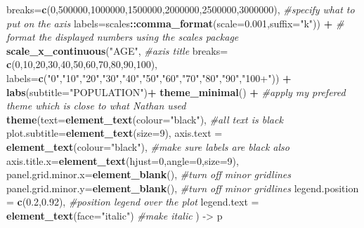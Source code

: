 \documentclass[]{article}
\newenvironment{Shaded}{\begin{snugshade}}{\end{snugshade}}
\newcommand{\KeywordTok}[1]{\textcolor[rgb]{0.13,0.29,0.53}{\textbf{#1}}}
\newcommand{\DataTypeTok}[1]{\textcolor[rgb]{0.13,0.29,0.53}{#1}}
\newcommand{\DecValTok}[1]{\textcolor[rgb]{0.00,0.00,0.81}{#1}}
\newcommand{\FloatTok}[1]{\textcolor[rgb]{0.00,0.00,0.81}{#1}}
\newcommand{\StringTok}[1]{\textcolor[rgb]{0.31,0.60,0.02}{#1}}
\newcommand{\CommentTok}[1]{\textcolor[rgb]{0.56,0.35,0.01}{\textit{#1}}}
\newcommand{\OperatorTok}[1]{\textcolor[rgb]{0.81,0.36,0.00}{\textbf{#1}}}
\newcommand{\NormalTok}[1]{#1}
\begin{document}
\begin{Shaded}
\begin{Highlighting}[]
{                     \DataTypeTok{breaks=}\KeywordTok{c}\NormalTok{(}\DecValTok{0}\NormalTok{,}\DecValTok{500000}\NormalTok{,}\DecValTok{1000000}\NormalTok{,}\DecValTok{1500000}\NormalTok{,}\DecValTok{2000000}\NormalTok{,}\DecValTok{2500000}\NormalTok{,}\DecValTok{3000000}\NormalTok{), }\CommentTok{#specify what to put on the axis}
                     \DataTypeTok{labels=}\NormalTok{scales}\OperatorTok{::}\KeywordTok{comma_format}\NormalTok{(}\DataTypeTok{scale=}\FloatTok{0.001}\NormalTok{,}\DataTypeTok{suffix=}\StringTok{"k"}\NormalTok{)) }\OperatorTok{+}\StringTok{ }\CommentTok{# format the displayed numbers using the scales package}
\StringTok{  }\KeywordTok{scale_x_continuous}\NormalTok{(}\StringTok{"AGE"}\NormalTok{, }\CommentTok{#axis title}
                     \DataTypeTok{breaks=} \KeywordTok{c}\NormalTok{(}\DecValTok{0}\NormalTok{,}\DecValTok{10}\NormalTok{,}\DecValTok{20}\NormalTok{,}\DecValTok{30}\NormalTok{,}\DecValTok{40}\NormalTok{,}\DecValTok{50}\NormalTok{,}\DecValTok{60}\NormalTok{,}\DecValTok{70}\NormalTok{,}\DecValTok{80}\NormalTok{,}\DecValTok{90}\NormalTok{,}\DecValTok{100}\NormalTok{),}
                     \DataTypeTok{labels=}\KeywordTok{c}\NormalTok{(}\StringTok{"0"}\NormalTok{,}\StringTok{"10"}\NormalTok{,}\StringTok{"20"}\NormalTok{,}\StringTok{"30"}\NormalTok{,}\StringTok{"40"}\NormalTok{,}\StringTok{"50"}\NormalTok{,}\StringTok{"60"}\NormalTok{,}\StringTok{"70"}\NormalTok{,}\StringTok{"80"}\NormalTok{,}\StringTok{"90"}\NormalTok{,}\StringTok{"100+"}\NormalTok{)) }\OperatorTok{+}
\StringTok{  }\KeywordTok{labs}\NormalTok{(}\DataTypeTok{subtitle=}\StringTok{"POPULATION"}\NormalTok{)}\OperatorTok{+}
\StringTok{  }\KeywordTok{theme_minimal}\NormalTok{() }\OperatorTok{+}\StringTok{ }\CommentTok{#apply my prefered theme which is close to what Nathan used}
\StringTok{  }\KeywordTok{theme}\NormalTok{(}\DataTypeTok{text=}\KeywordTok{element_text}\NormalTok{(}\DataTypeTok{colour=}\StringTok{"black"}\NormalTok{), }\CommentTok{#all text is black}
        \DataTypeTok{plot.subtitle=}\KeywordTok{element_text}\NormalTok{(}\DataTypeTok{size=}\DecValTok{9}\NormalTok{),}
        \DataTypeTok{axis.text =} \KeywordTok{element_text}\NormalTok{(}\DataTypeTok{colour=}\StringTok{"black"}\NormalTok{), }\CommentTok{#make sure labels are black also}
        \DataTypeTok{axis.title.x=}\KeywordTok{element_text}\NormalTok{(}\DataTypeTok{hjust=}\DecValTok{0}\NormalTok{,}\DataTypeTok{angle=}\DecValTok{0}\NormalTok{,}\DataTypeTok{size=}\DecValTok{9}\NormalTok{),}
        \DataTypeTok{panel.grid.minor.x=}\KeywordTok{element_blank}\NormalTok{(), }\CommentTok{#turn off minor gridlines}
        \DataTypeTok{panel.grid.minor.y=}\KeywordTok{element_blank}\NormalTok{(), }\CommentTok{#turn off minor gridlines}
        \DataTypeTok{legend.position =} \KeywordTok{c}\NormalTok{(}\FloatTok{0.2}\NormalTok{,}\FloatTok{0.92}\NormalTok{), }\CommentTok{#position legend over the plot}
        \DataTypeTok{legend.text =} \KeywordTok{element_text}\NormalTok{(}\DataTypeTok{face=}\StringTok{"italic"}\NormalTok{) }\CommentTok{#make italic}
\NormalTok{        ) ->}\StringTok{ }\NormalTok{p}

}
\end{Highlighting}
\end{Shaded}
\end{document}
